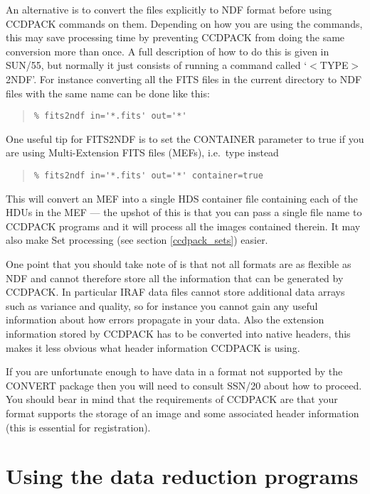 \documentclass[twoside,11pt]{article}
\newcommand{\latexhtml}[2]{#1}
\newcommand{\xref}[3]{#1}
\newcommand{\xlabel}[1]{}
\renewcommand{\_}{\texttt{\symbol{95}}}
\newcommand{\ttsize}{\latexhtml{\small}{}}
\newenvironment{myquote}{\begin{quote}\ttsize}{\end{quote}}
\begin{document}
An alternative is to convert the files explicitly to NDF format
before using CCDPACK commands on them.
Depending on how you are using the commands, this may save processing
time by preventing CCDPACK from doing the same conversion more than once.
A full description of how to do this is given in \xref{SUN/55}{sun55}{},
but normally it just consists of running a command called `$<$TYPE$>$2NDF'.
For instance converting all the FITS files in the current directory
to NDF files with the same name can be done like this:
\begin{myquote}
\begin{verbatim}
% fits2ndf in='*.fits' out='*' 
\end{verbatim}
\end{myquote}
One useful tip for \xref{FITS2NDF}{sun55}{FITS2NDF} 
is to set the CONTAINER parameter to true if you are using Multi-Extension
FITS files (MEFs), i.e.\ type instead
\begin{myquote}
\begin{verbatim}
% fits2ndf in='*.fits' out='*' container=true
\end{verbatim}
\end{myquote}
This will convert an MEF into a single HDS container file
containing each of the HDUs in the MEF --- the upshot of this is that
you can pass a single file name to CCDPACK programs and it will
process all the images contained therein.
It may also make Set processing (see section \ref{ccdpack_sets}) easier.

One point that you should take note of is that not all formats are as
flexible as NDF and cannot therefore store all the information that
can be generated by CCDPACK. In particular IRAF data files cannot
store additional data arrays such as variance and quality, so for
instance you cannot gain any useful information about how errors
propagate in your data. Also the extension information stored by
CCDPACK has to be converted into native headers, this makes it less
obvious what header information CCDPACK is using.

If you are unfortunate enough to have data in a format not supported by the
CONVERT package then you will need to consult \xref{SSN/20}{ssn20}{}
about how to proceed. You should bear in mind that the requirements
of CCDPACK are that your format supports the storage of an image and
some associated header information (this is essential for registration).

\section{Using the data reduction programs\xlabel{DIY}}
\end{document}
